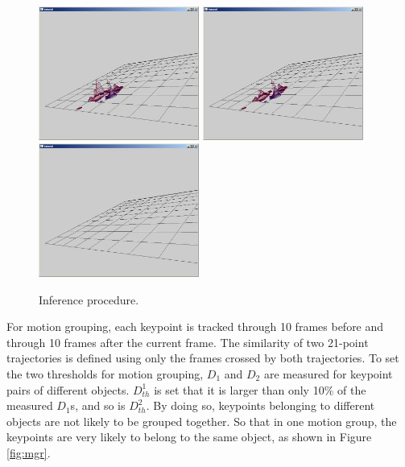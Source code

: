 \begin{figure}
\includegraphics[width=0.47\textwidth,bb=0 20 766 637]{inf6.jpg}
\includegraphics[width=0.47\textwidth,bb=0 20 766 637]{inf7.jpg}
\includegraphics[width=0.47\textwidth,bb=0 20 766 637]{inf8.jpg}
\caption[Inference procedure]{Inference procedure.}
\label{fig:inf}
\end{figure}

For motion grouping, each keypoint is tracked through 10 frames before and through 10 frames after the current frame. The similarity of two 21-point trajectories is defined using only  the frames crossed by both trajectories. To set the two thresholds for motion grouping, $D_1$ and $D_2$ are  measured for keypoint pairs of different objects. $D^1_{th}$ is set that it is larger than only 10\% of the measured $D_1$s, and so is $D^2_{th}$. By doing so, keypoints belonging to different objects are not likely to be grouped together. So that in one motion group, the keypoints are very likely to belong to the same object, as shown in Figure \ref{fig:mgr}.


